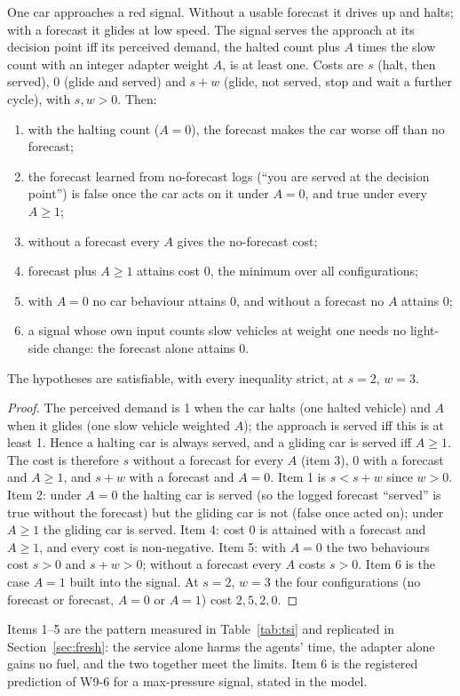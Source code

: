 \begin{theorem}\label{thm:twosided}
One car approaches a red signal. Without a usable forecast it drives up and halts; with a forecast it glides at low speed. The signal serves
the approach at its decision point iff its perceived demand, the halted count plus $A$ times the slow count with an integer adapter weight
$A$, is at least one. Costs are $s$ (halt, then served), $0$ (glide and served) and $s+w$ (glide, not served, stop and wait a further
cycle), with $s,w>0$. Then:
\begin{enumerate}\setlength\itemsep{0pt}
\item with the halting count ($A=0$), the forecast makes the car worse off than no forecast;
\item the forecast learned from no-forecast logs (``you are served at the decision point'') is false once the car acts on it under $A=0$,
and true under every $A\ge1$;
\item without a forecast every $A$ gives the no-forecast cost;
\item forecast plus $A\ge1$ attains cost 0, the minimum over all configurations;
\item with $A=0$ no car behaviour attains 0, and without a forecast no $A$ attains 0;
\item a signal whose own input counts slow vehicles at weight one needs no light-side change: the forecast alone attains 0.
\end{enumerate}
The hypotheses are satisfiable, with every inequality strict, at $s=2$, $w=3$.
\end{theorem}
\begin{proof}
The perceived demand is 1 when the car halts (one halted vehicle) and $A$ when it glides (one slow vehicle weighted $A$); the approach is
served iff this is at least 1. Hence a halting car is always served, and a gliding car is served iff $A\ge1$. The cost is therefore $s$
without a forecast for every $A$ (item 3), $0$ with a forecast and $A\ge1$, and $s+w$ with a forecast and $A=0$. Item 1 is $s<s+w$ since
$w>0$. Item 2: under $A=0$ the halting car is served (so the logged forecast ``served'' is true without the forecast) but the gliding car is
not (false once acted on); under $A\ge1$ the gliding car is served. Item 4: cost 0 is attained with a forecast and $A\ge1$, and every cost
is non-negative. Item 5: with $A=0$ the two behaviours cost $s>0$ and $s+w>0$; without a forecast every $A$ costs $s>0$. Item 6 is the case
$A=1$ built into the signal. At $s=2$, $w=3$ the four configurations (no forecast or forecast, $A=0$ or $A=1$) cost $2,5,2,0$.
\end{proof}
Items 1--5 are the pattern measured in Table~\ref{tab:tsi} and replicated in Section~\ref{sec:fresh}: the service alone harms the agents'
time, the adapter alone gains no fuel, and the two together meet the limits. Item 6 is the registered prediction of W9-6 for a
max-pressure signal, stated in the model.

